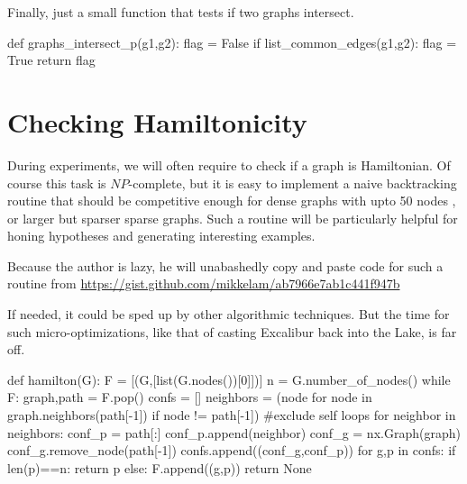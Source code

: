 Finally, just a small function that tests if two graphs intersect. 

\nwenddocs{}\plusendmoddef\nwstartdeflinemarkup{}\nwenddeflinemarkup
def graphs_intersect_p(g1,g2):
     flag = False
     if list_common_edges(g1,g2):     
          flag = True 
     return flag
\nwendcode{}\nwdocspar

\section{Checking Hamiltonicity}

During experiments, we will often require to check if a graph is Hamiltonian. Of course
this task is $NP$-complete, but it is easy to implement a naive backtracking routine 
that should be competitive enough for dense graphs with upto 50 nodes , 
or larger but sparser sparse graphs. Such a routine will be particularly helpful
for honing hypotheses and generating interesting examples. 

Because the author is lazy, he will unabashedly copy and paste code for such a routine from  
\url{https://gist.github.com/mikkelam/ab7966e7ab1c441f947b}

If needed, it could be sped up by other algorithmic techniques. 
But the time for such micro-optimizations, like that of casting 
Excalibur back into the Lake, is far off. 


\nwenddocs{}\plusendmoddef\nwstartdeflinemarkup{}\nwenddeflinemarkup
def hamilton(G):
    F = [(G,[list(G.nodes())[0]])]
    n = G.number_of_nodes()
    while F:
        graph,path = F.pop()
        confs = []
        neighbors = (node for node in graph.neighbors(path[-1]) 
                     if node != path[-1]) #exclude self loops
        for neighbor in neighbors:
            conf_p = path[:]
            conf_p.append(neighbor)
            conf_g = nx.Graph(graph)
            conf_g.remove_node(path[-1])
            confs.append((conf_g,conf_p))
        for g,p in confs:
            if len(p)==n:
                return p
            else:
                F.append((g,p))
    return None
\nwendcode{}\nwdocspar

